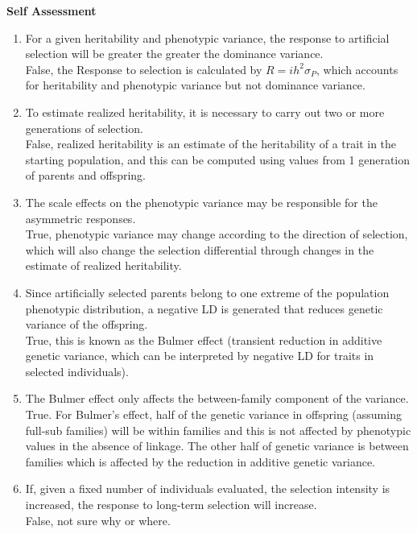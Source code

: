 \documentclass[12pt]{amsart}
\begin{document}
{\large \bf Self Assessment}
\begin{enumerate}
\item For a given heritability and phenotypic variance, the response to artificial selection will be greater the greater the dominance variance.\\
False, the Response to selection is calculated by $R = ih^2\sigma_P$, which accounts for heritability and phenotypic variance but not dominance variance.\\
\item To estimate realized heritability, it is necessary to carry out two or more generations of selection.\\
False, realized heritability is an estimate of the heritability of a trait in the starting population, and this can be computed using values from 1 generation of parents and offspring.\\
\item The scale effects on the phenotypic variance may be responsible for the asymmetric responses.\\
True, phenotypic variance may change according to the direction of selection, which will also change the selection differential through changes in the estimate of realized heritability.\\
\item Since artificially selected parents belong to one extreme of the population phenotypic distribution, a negative LD is generated that reduces genetic variance of the offspring.\\
True, this is known as the Bulmer effect (transient reduction in additive genetic variance, which can be interpreted by negative LD for traits in selected individuals).\\
\item The Bulmer effect only affects the between-family component of the variance.\\
True. For Bulmer's effect, half of the genetic variance in offspring (assuming full-sub families) will be within families and this is not affected by phenotypic values in the absence of linkage. The other half of genetic variance is between families which is affected by the reduction in additive genetic variance.\\
\item If, given a fixed number of individuals evaluated, the selection intensity is increased, the response to long-term selection will increase.\\
False, not sure why or where.\\

\end{enumerate}
\end{document}
